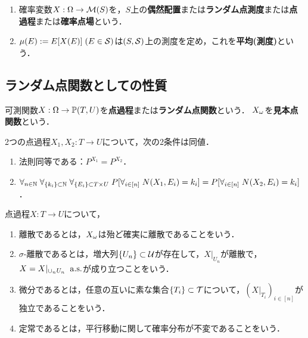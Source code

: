 \documentclass[uplatex,dvipdfmx]{jsreport}
\begin{document}
\begin{definition}\mbox{}
    \begin{enumerate}
        \item 確率変数$X:\Om\to\M(S)$を，$S$上の\textbf{偶然配置}または\textbf{ランダム点測度}または\textbf{点過程}または\textbf{確率点場}という．
        \item $\mu(E):=E[X(E)]\;(E\in\S)$は$(S,\S)$上の測度を定め，これを\textbf{平均(測度)}という．
    \end{enumerate}
\end{definition}

\subsection{ランダム点関数としての性質}

\begin{definition}
    可測関数$X:\Om\to \bP(T,U)$を\textbf{点過程}または\textbf{ランダム点関数}という．
    $X_\om$を\textbf{見本点関数}という．
\end{definition}

\begin{lemma}
    2つの点過程$X_1,X_2:T\to U$について，次の2条件は同値．
    \begin{enumerate}
        \item 法則同等である：$P^{X_1}=P^{X_2}$．
        \item $\forall_{n\in\N}\;\forall_{\{k_i\}\subset\N}\;\forall_{\{E_i\}\subset T\times U}\;P[\forall_{i\in[n]}\;N(X_1,E_i)=k_i]=P[\forall_{i\in[n]}\;N(X_2,E_i)=k_i]$．
    \end{enumerate}
\end{lemma}

\begin{definition}
    点過程$X:T\to U$について，
    \begin{enumerate}
        \item 離散であるとは，$X_\om$は殆ど確実に離散であることをいう．
        \item $\sigma$-離散であるとは，増大列$\{U_n\}\subset\U$が存在して，$X|_{U_n}$が離散で，$X=X|_{\cup_nU_n}\;\as$が成り立つことをいう．
        \item 微分であるとは，任意の互いに素な集合$\{T_i\}\subset\cT$について，$(X|_{T_i})_{i\in[n]}$が独立であることをいう．
        \item 定常であるとは，平行移動に関して確率分布が不変であることをいう．
    \end{enumerate}
\end{definition}
\end{document}
